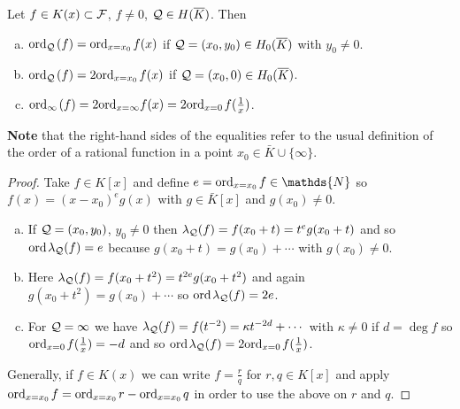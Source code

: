 \documentclass[english,11pt,a4paper]{article}
\begin{document}
\begin{lemma}\label{two}
  Let $f \in K(x) \subset \mathcal{F}$, $f \neq 0$, $\mathcal{Q} \in H(\overline K)$. Then
  \begin{enumerate}[(a)]\parskip 1mm
    \item $\text{ord}_{\mathcal{Q}}\hspace{0.4mm} (f) = \text{ord}_{x=x_0}\hspace{0.4mm} f(x)$ if $\mathcal{Q} = (x_0,y_0) \in H_0(\overline K)$ with $y_0 \neq 0$.
    \item $\text{ord}_{\mathcal{Q}}\hspace{0.4mm} (f) = 2 \text{ord}_{x=x_0}\hspace{0.4mm} f(x)$ if $\mathcal{Q} = (x_0,0) \in H_0(\overline K)$.
    \item $\text{ord}_{\infty}\hspace{0.4mm} (f) = 2 \text{ord}_{x=\infty} f(x) = 2 \text{ord}_{x=0}\hspace{0.4mm} f(\frac 1 x)$.
  \end{enumerate}\parskip 3mm
  \textbf{Note} that the right-hand sides of the equalities refer to the usual definition of the order of a rational function in a point $x_0 \in \bar K \cup \{ \infty \}$.%
  \begin{proof}
    Take $f \in K[x]$ and define $e = \ordx f \in \mathds{N}$ so $f(x) = (x-x_0)^e g(x)$ with $g \in \bar K[x]$ and $g(x_0)\neq 0$.
    \begin{enumerate}[(a)]
      \item If $\mathcal{Q} =(x_0,y_0)$, $y_0 \neq 0$ then $\lambda_{\mathcal{Q}} (f) = f(x_0 + t) = t^e g(x_0 + t)$ and so $\text{ord\hspace{0.4mm}} \lambda_{\mathcal{Q}} (f) = e$ because $g(x_0 + t) = g(x_0) + \cdots$ with $g(x_0) \neq 0$.

      \item Here $\lambda_{\mathcal{Q}} (f) = f(x_0 + t^2) = t^{2e} g(x_0 + t^2)$ and again $g(x_0 + t^2) = g(x_0) + \cdots$ so $\text{ord\hspace{0.4mm}} \lambda_{\mathcal{Q}} (f) = 2e$.

      \item For $\mathcal{Q} = \infty$ we have $\lambda_{\mathcal{Q}} (f) = f(t^{-2}) = \kappa t^{-2d}+ \cdots$ with $\kappa \neq 0$ if $d = \deg f$ so $\text{ord}_{x=0}\hspace{0.4mm} f(\frac 1 x ) = -d$ and so $\text{ord\hspace{0.4mm}} \lambda_{\mathcal{Q}} (f) = 2 \text{ord}_{x=0}\hspace{0.4mm} f(\frac 1 x )$.
    \end{enumerate}
    Generally, if $f \in K(x)$ we can write $f = \frac r q$ for $r, q \in K[x]$ and apply $\text{ord}_{x=x_0}\hspace{0.4mm} f = \text{ord}_{x=x_0}\hspace{0.4mm} r - \text{ord}_{x=x_0}\hspace{0.4mm} q$ in order to use the above on $r$ and $q$.
  \end{proof}
\end{lemma}
\end{document}
